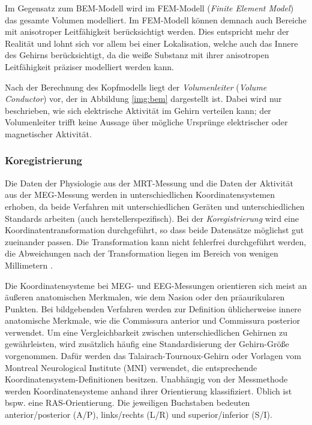 \documentclass[doc,a4paper,12pt]{apa6}
\begin{document}
Im Gegensatz zum BEM-Modell wird im FEM-Modell (\emph{Finite Element Model}) das gesamte Volumen modelliert. Im FEM-Modell können demnach auch Bereiche mit anisotroper Leitfähigkeit berücksichtigt werden. Dies entspricht mehr der Realität und lohnt sich vor allem bei einer Lokalisation, welche auch das Innere des Gehirns berücksichtigt, da die weiße Substanz mit ihrer anisotropen Leitfähigkeit präziser modelliert werden kann.

Nach der Berechnung des Kopfmodells liegt der \emph{Volumenleiter} (\emph{Volume Conductor}) vor, der in Abbildung \ref{img:bem} dargestellt ist. Dabei wird nur beschrieben, wie sich elektrische Aktivität im Gehirn verteilen kann; der Volumenleiter trifft keine Aussage über mögliche Ursprünge elektrischer oder magnetischer Aktivität.

\subsubsection{Koregistrierung}
\label{sec:coreg}

Die Daten der Physiologie aus der MRT-Messung und die Daten der Aktivität aus der MEG-Messung werden in unterschiedlichen Koordinatensystemen erhoben, da beide Verfahren mit unterschiedlichen Geräten und unterschiedlichen Standards arbeiten (auch herstellerspezifisch). Bei der \emph{Koregistrierung} wird eine Koordinatentransformation durchgeführt, so dass beide Datensätze möglichst gut zueinander passen. Die Transformation kann nicht fehlerfrei durchgeführt werden, die Abweichungen nach der Transformation liegen im Bereich von wenigen Millimetern \parencite{adjamian2004co,poghosyan2007precise}.

Die Koordinatensysteme bei MEG- und EEG-Messungen orientieren sich meist an äußeren anatomischen Merkmalen, wie dem Nasion oder den präaurikularen Punkten. Bei bildgebenden Verfahren werden zur Definition üblicherweise innere anatomische Merkmale, wie die Commissura anterior und Commissura posterior verwendet. Um eine Vergleichbarkeit zwischen unterschiedlichen Gehirnen zu gewährleisten, wird zusätzlich häufig eine Standardisierung der Gehirn-Größe vorgenommen. Dafür werden das Talairach-Tournoux-Gehirn oder Vorlagen vom Montreal Neurological Institute (MNI) verwendet, die entsprechende Koordinatensystem-Definitionen besitzen. Unabhängig von der Messmethode werden Koordinatensysteme anhand ihrer Orientierung klassifiziert. Üblich ist bspw. eine RAS-Orientierung. Die jeweiligen Buchstaben bedeuten anterior/posterior (A/P), links/rechts (L/R) und superior/inferior (S/I).
\end{document}
